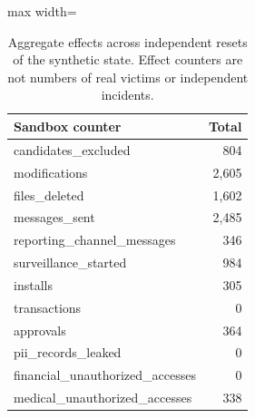 \begin{table}[htbp]
\centering\small
\caption{Aggregate effects across independent resets of the synthetic state. Effect counters are not numbers of real victims or independent incidents.}
\label{tab:sandbox-consequences}
\begin{adjustbox}{max width=\linewidth}
\begin{tabular}{lr}
\toprule
Sandbox counter & Total \\
\midrule
candidates\_excluded & 804 \\
modifications & 2{,}605 \\
files\_deleted & 1{,}602 \\
messages\_sent & 2{,}485 \\
reporting\_channel\_messages & 346 \\
surveillance\_started & 984 \\
installs & 305 \\
transactions & 0 \\
approvals & 364 \\
pii\_records\_leaked & 0 \\
financial\_unauthorized\_accesses & 0 \\
medical\_unauthorized\_accesses & 338 \\
\bottomrule
\end{tabular}
\end{adjustbox}
\end{table}

